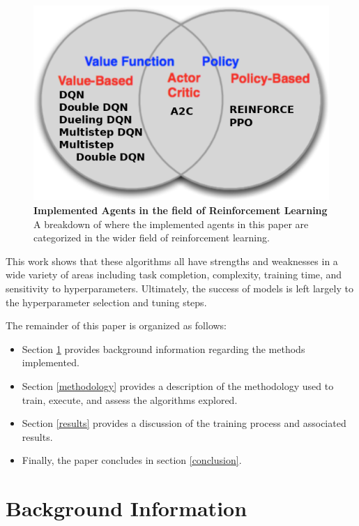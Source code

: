 \documentclass[conference]{IEEEtran}
\begin{document}
\begin{figure}[htbp]
\centerline{\includegraphics[scale=0.4]{implemented_agents.png}}
\caption{\textbf{Implemented Agents in the field of Reinforcement Learning}  A breakdown of where the implemented agents in this paper are categorized in the wider field of reinforcement learning.}
\label{fig:agentsImplemented}
\end{figure}

This work shows that these algorithms all have strengths and weaknesses in a wide variety of areas including task completion, complexity, training time, and sensitivity to hyperparameters. Ultimately, the success of models is left largely to the hyperparameter selection and tuning steps.

The remainder of this paper is organized as follows:
\begin{itemize}
\item Section \ref{background} provides background information regarding the methods implemented.
\item Section \ref{methodology} provides a description of the methodology used to train, execute, and assess the algorithms explored.
\item Section \ref{results} provides a discussion of the training process and associated results.
\item Finally, the paper concludes in section \ref{conclusion}.
\end{itemize}

\section{Background Information} \label{background}
\end{document}
